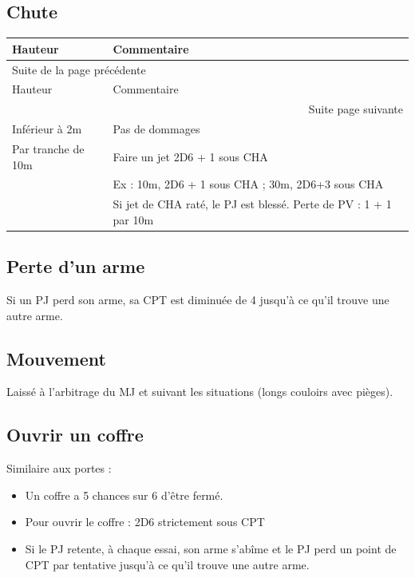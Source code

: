 \documentclass[a4paper, 11pt, twoside]{article}
\begin{document}
\subsection{Chute}
\label{sec:orgbf2520b}

\begin{longtable}{l|l}
Hauteur & Commentaire\\
\hline
\endfirsthead
\multicolumn{2}{l}{Suite de la page précédente} \\
\hline

Hauteur & Commentaire \\

\hline
\endhead
\hline\multicolumn{2}{r}{Suite page suivante} \\
\endfoot
\endlastfoot
\hline
Inférieur à 2m & Pas de dommages\\
Par tranche de 10m & Faire un jet 2D6 + 1 sous CHA\\
 & Ex : 10m, 2D6 + 1 sous CHA ; 30m, 2D6+3 sous CHA\\
 & Si jet de CHA raté, le PJ est blessé. Perte de PV : 1 + 1 par 10m\\
\end{longtable}

\subsection{Perte d'un arme}
\label{sec:org8be58ad}

Si un PJ perd son arme, sa CPT est diminuée de 4 jusqu'à ce qu'il trouve une autre arme.

\subsection{Mouvement}
\label{sec:orge22b34d}

Laissé à l'arbitrage du MJ et suivant les situations (longs couloirs avec pièges).

\subsection{Ouvrir un coffre}
\label{sec:org6562b48}

Similaire aux portes :
\begin{itemize}
\item Un coffre a 5 chances sur 6 d'être fermé.
\item Pour ouvrir le coffre : 2D6 strictement sous CPT
\item Si le PJ retente, à chaque essai, son arme s'abîme et le PJ perd un point de CPT par tentative jusqu'à ce qu'il trouve une autre arme.
\end{itemize}
\end{document}
